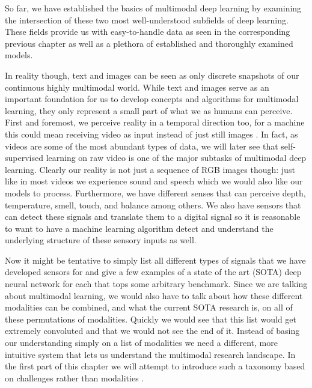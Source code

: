 \documentclass[
]{krantz}
\begin{document}
So far, we have established the basics of multimodal deep learning by examining the intersection of these two most well-understood subfields of deep learning. These fields provide us with easy-to-handle data as seen in the corresponding previous chapter as well as a plethora of established and thoroughly examined models.

In reality though, text and images can be seen as only discrete snapshots of our continuous highly multimodal world. While text and images serve as an important foundation for us to develop concepts and algorithms for multimodal learning, they only represent a small part of what we as humans can perceive. First and foremost, we perceive reality in a temporal direction too, for a machine this could mean receiving video as input instead of just still images \citep{iv2021multimodal}. In fact, as videos are some of the most abundant types of data, we will later see that self-supervised learning on raw video is one of the major subtasks of multimodal deep learning. Clearly our reality is not just a sequence of RGB images though: just like in most videos we experience sound and speech which we would also like our models to process. Furthermore, we have different senses that can perceive depth, temperature, smell, touch, and balance among others. We also have sensors that can detect these signals and translate them to a digital signal so it is reasonable to want to have a machine learning algorithm detect and understand the underlying structure of these sensory inputs as well.

Now it might be tentative to simply list all different types of signals that we have developed sensors for and give a few examples of a state of the art (SOTA) deep neural network for each that tops some arbitrary benchmark. Since we are talking about multimodal learning, we would also have to talk about how these different modalities can be combined, and what the current SOTA research is, on all of these permutations of modalities. Quickly we would see that this list would get extremely convoluted and that we would not see the end of it. Instead of basing our understanding simply on a list of modalities we need a different, more intuitive system that lets us understand the multimodal research landscape. In the first part of this chapter we will attempt to introduce such a taxonomy based on challenges rather than modalities \citep{baltrušaitis2017multimodal}.
\end{document}
